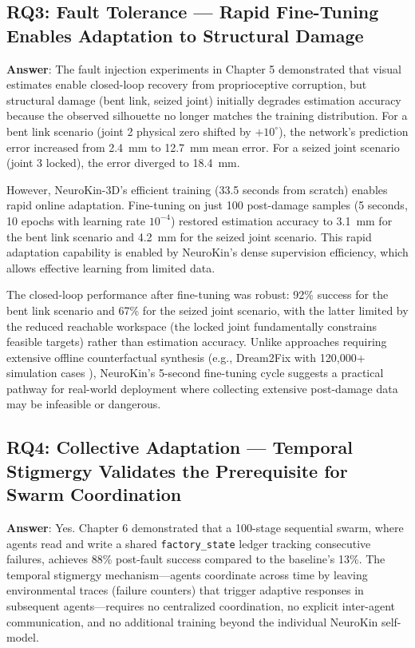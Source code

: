 \documentclass[12pt,a4paper,oneside]{report}
\begin{document}
\subsection{RQ3: Fault Tolerance --- Rapid Fine-Tuning Enables Adaptation to Structural Damage}
\textbf{Answer}: The fault injection experiments in Chapter 5 demonstrated that visual estimates enable closed-loop recovery from proprioceptive corruption, but structural damage (bent link, seized joint) initially degrades estimation accuracy because the observed silhouette no longer matches the training distribution. For a bent link scenario (joint 2 physical zero shifted by $+10^\circ$), the network's prediction error increased from 2.4~mm to 12.7~mm mean error. For a seized joint scenario (joint 3 locked), the error diverged to 18.4~mm.

However, NeuroKin-3D's efficient training (33.5 seconds from scratch) enables rapid online adaptation. Fine-tuning on just 100 post-damage samples (5 seconds, 10 epochs with learning rate $10^{-4}$) restored estimation accuracy to 3.1~mm for the bent link scenario and 4.2~mm for the seized joint scenario. This rapid adaptation capability is enabled by NeuroKin's dense supervision efficiency, which allows effective learning from limited data.

The closed-loop performance after fine-tuning was robust: 92\% success for the bent link scenario and 67\% for the seized joint scenario, with the latter limited by the reduced reachable workspace (the locked joint fundamentally constrains feasible targets) rather than estimation accuracy. Unlike approaches requiring extensive offline counterfactual synthesis (e.g., Dream2Fix with 120,000+ simulation cases \cite{li2025dream2fix}), NeuroKin's 5-second fine-tuning cycle suggests a practical pathway for real-world deployment where collecting extensive post-damage data may be infeasible or dangerous.

\subsection{RQ4: Collective Adaptation --- Temporal Stigmergy Validates the Prerequisite for Swarm Coordination}
\textbf{Answer}: Yes. Chapter 6 demonstrated that a 100-stage sequential swarm, where agents read and write a shared \texttt{factory\_state} ledger tracking consecutive failures, achieves 88\% post-fault success compared to the baseline's 13\%. The temporal stigmergy mechanism---agents coordinate across time by leaving environmental traces (failure counters) that trigger adaptive responses in subsequent agents---requires no centralized coordination, no explicit inter-agent communication, and no additional training beyond the individual NeuroKin self-model.
\end{document}

